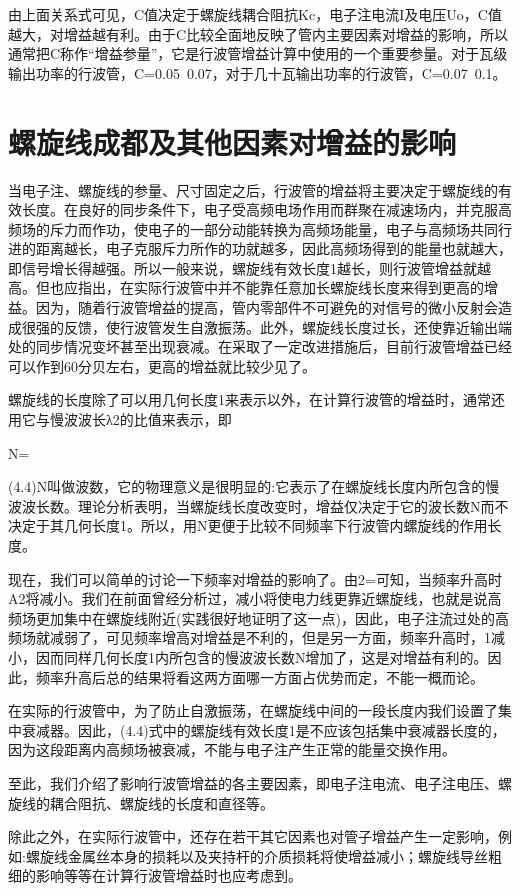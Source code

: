  
 由上面关系式可见，C值决定于螺旋线耦合阻抗Kc，电子注电流I及电压Uo，C值越大，对增益越有利。由于C比较全面地反映了管内主要因素对增益的影响，所以通常把C称作“增益参量”，它是行波管增益计算中使用的一个重要参量。对于瓦级输出功率的行波管，C=0.05~0.07，对于几十瓦输出功率的行波管，C=0.07~0.1。
 
\section{螺旋线成都及其他因素对增益的影响}
 当电子注、螺旋线的参量、尺寸固定之后，行波管的增益将主要决定于螺旋线的有效长度。在良好的同步条件下，电子受高频电场作用而群聚在减速场内，并克服高频场的斥力而作功，使电子的一部分动能转换为高频场能量，电子与高频场共同行进的距离越长，电子克服斥力所作的功就越多，因此高频场得到的能量也就越大，即信号增长得越强。所以一般来说，螺旋线有效长度1越长，则行波管增益就越高。但也应指出，在实际行波管中并不能靠任意加长螺旋线长度来得到更高的增益。因为，随着行波管增益的提高，管内零部件不可避免的对信号的微小反射会造成很强的反馈，使行波管发生自激振荡。此外，螺旋线长度过长，还使靠近输出端处的同步情况变坏甚至出现衰减。在采取了一定改进措施后，目前行波管增益已经可以作到60分贝左右，更高的增益就比较少见了。

 
 螺旋线的长度除了可以用几何长度1来表示以外，在计算行波管的增益时，通常还用它与慢波波长λ2的比值来表示，即

 
 N=

 
 (4.4)N叫做波数，它的物理意义是很明显的:它表示了在螺旋线长度内所包含的慢波波长数。理论分析表明，当螺旋线长度改变时，增益仅决定于它的波长数N而不决定于其几何长度1。所以，用N更便于比较不同频率下行波管内螺旋线的作用长度。

 
 现在，我们可以简单的讨论一下频率对增益的影响了。由2=可知，当频率升高时A2将减小。我们在前面曾经分析过，减小将使电力线更靠近螺旋线，也就是说高频场更加集中在螺旋线附近(实践很好地证明了这一点)，因此，电子注流过处的高频场就减弱了，可见频率增高对增益是不利的，但是另一方面，频率升高时，1减小，因而同样几何长度1内所包含的慢波波长数N增加了，这是对增益有利的。因此，频率升高后总的结果将看这两方面哪一方面占优势而定，不能一概而论。

 
 在实际的行波管中，为了防止自激振荡，在螺旋线中间的一段长度内我们设置了集中衰减器。因此，(4.4)式中的螺旋线有效长度1是不应该包括集中衰减器长度的，因为这段距离内高频场被衰减，不能与电子注产生正常的能量交换作用。

 
 至此，我们介绍了影响行波管增益的各主要因素，即电子注电流、电子注电压、螺旋线的耦合阻抗、螺旋线的长度和直径等。

 
 除此之外，在实际行波管中，还存在若干其它因素也对管子增益产生一定影响，例如:螺旋线金属丝本身的损耗以及夹持杆的介质损耗将使增益减小；螺旋线导丝粗细的影响等等在计算行波管增益时也应考虑到。
 
